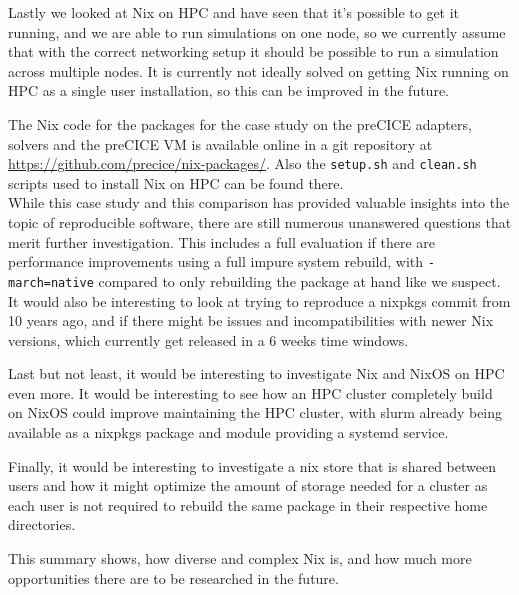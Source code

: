 \documentclass[conference,final,a4paper]{IEEEtran}
\begin{document}
Lastly we looked at Nix on HPC and have seen that it's possible to get it running, and we are able to run simulations on one node, so we currently assume that with the correct networking setup it should be possible to run a simulation across multiple nodes.
It is currently not ideally solved on getting Nix running on HPC as a single user installation, so this can be improved in the future.

The Nix code for the packages for the case study on the preCICE adapters, solvers and the preCICE VM is available online in a git repository at \url{https://github.com/precice/nix-packages/}.
Also the \texttt{setup.sh} and \texttt{clean.sh} scripts used to install Nix on HPC can be found there.\\


While this case study and this comparison has provided valuable insights into the topic of reproducible software, there are still numerous unanswered questions that merit further investigation.
This includes a full evaluation if there are performance improvements using a full impure system rebuild, with \texttt{-march=native} compared to only rebuilding the package at hand like we suspect.
It would also be interesting to look at trying to reproduce a nixpkgs commit from 10 years ago, and if there might be issues and incompatibilities with newer Nix versions, which currently get released in a 6 weeks time windows.

Last but not least, it would be interesting to investigate Nix and NixOS on HPC even more.
It would be interesting to see how an HPC cluster completely build on NixOS could improve maintaining the HPC cluster, with slurm already being available as a nixpkgs package and module providing a systemd service.

Finally, it would be interesting to investigate a nix store that is shared between users and how it might optimize the amount of storage needed for a cluster as each user is not required to rebuild the same package in their respective home directories.

This summary shows, how diverse and complex Nix is, and how much more opportunities there are to be researched in the future.



\end{document}
